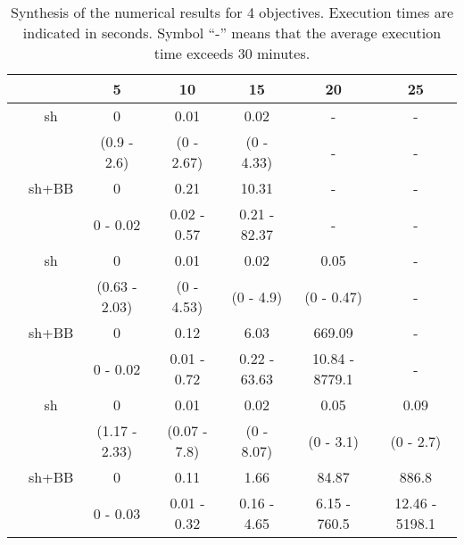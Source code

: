 \documentclass[final,3p,times]{elsarticle}
\begin{document}
\begin{table}[!h]
  \begin{center}
  {\small \begin{tabular}{|c|c|ccccc|}
    \hline
       \rule[1pt]{0pt}{13pt} 
       & & 5&10&15&20&25\\
       \hline
     \hline
    & sh&0&0.01&0.02&-&-\\
          & &(0.9 - 2.6)&(0 - 2.67)&(0 - 4.33)& - & - \\

       \cline{2-7} 
       &sh+BB&0&0.21&10.31&-&-\\
       &  &0 - 0.02&0.02 - 0.57&0.21 - 82.37& - & - \\
  \hline
  \hline
   & sh&0&0.01&0.02&0.05&-\\
  & &(0.63 - 2.03)&(0 - 4.53)&(0 - 4.9)&(0 - 0.47)& - \\

    \cline{2-7} 
 &sh+BB&0&0.12&6.03&669.09&-\\
  &  &0 - 0.02&0.01 - 0.72&0.22 - 63.63&10.84 - 8779.1& - \\
  \hline
  \hline
  & sh&0&0.01&0.02&0.05&0.09\\
    & &(1.17 - 2.33)&(0.07 - 7.8)&(0 - 8.07)&(0 - 3.1)&(0 - 2.7)\\
  \cline{2-7} 
  &sh+BB&0&0.11&1.66&84.87&886.8\\
  &  &0 - 0.03&0.01 - 0.32&0.16 - 4.65&6.15 - 760.5&12.46 - 5198.1\\
  \hline
    \end{tabular}
}
\end{center}
\caption{\label{tabPL5} Synthesis of the numerical results for 4 objectives. Execution times are
  indicated in seconds. Symbol ``-'' means that the average execution time exceeds 30 minutes.}
\end{table}
\end{document}
